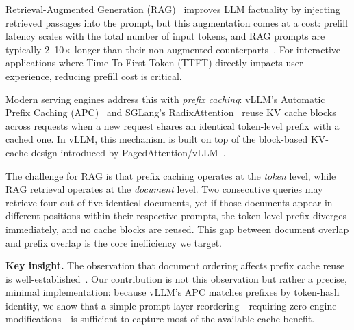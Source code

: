 \documentclass{article}
\begin{document}
Retrieval-Augmented Generation (RAG)~\citep{lewis2020rag} improves LLM factuality by injecting retrieved passages into the prompt, but this augmentation comes at a cost: prefill latency scales with the total number of input tokens, and RAG prompts are typically 2--10$\times$ longer than their non-augmented counterparts~\citep{gao2024ragsurvey}. For interactive applications where Time-To-First-Token (TTFT) directly impacts user experience, reducing prefill cost is critical.

Modern serving engines address this with \emph{prefix caching}: vLLM's Automatic Prefix Caching (APC)~\citep{vllm_apc} and SGLang's RadixAttention~\citep{zheng2024sglang} reuse KV cache blocks across requests when a new request shares an identical token-level prefix with a cached one. In vLLM, this mechanism is built on top of the block-based KV-cache design introduced by PagedAttention/vLLM~\citep{kwon2023pagedattention}.

The challenge for RAG is that prefix caching operates at the \emph{token} level, while RAG retrieval operates at the \emph{document} level. Two consecutive queries may retrieve four out of five identical documents, yet if those documents appear in different positions within their respective prompts, the token-level prefix diverges immediately, and no cache blocks are reused. This gap between document overlap and prefix overlap is the core inefficiency we target.

\textbf{Key insight.}  The observation that document ordering affects prefix cache reuse is well-established~\citep{jin2025ragcache,cachecraft2025,contextpilot2025}. Our contribution is not this observation but rather a precise, minimal implementation: because vLLM's APC matches prefixes by token-hash identity, we show that a simple prompt-layer reordering---requiring zero engine modifications---is sufficient to capture most of the available cache benefit.
\end{document}
